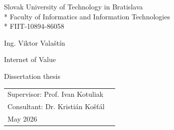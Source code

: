 \documentclass{article}
\begin{document}
\begin{center}
\large{
Slovak University of Technology in Bratislava
\\*
Faculty of Informatics and Information Technologies
\\*
\medskip{}
FIIT-10894-86058
}
\end{center}

\vspace*{\fill}

\begin{center}
\large{
Ing. Viktor Valaštín
\bigskip

Internet of Value
\bigskip

Dissertation thesis
}
\end{center}

\vspace*{\fill}

\noindent
\begin{tabular}{@{}l l}
    Supervisor: Prof. Ivan Kotuliak \\
    Consultant: Dr. Kristián Košťál \\
    May 2026
\end{tabular}
\end{document}
